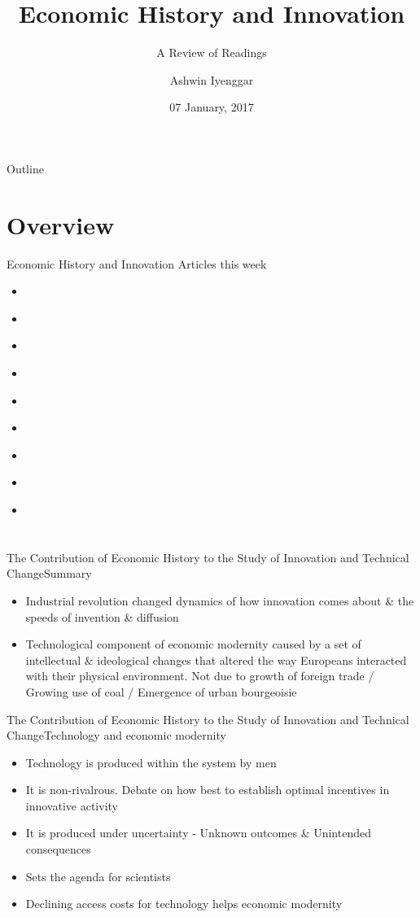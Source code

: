 \documentclass{beamer}
\title{Economic History and Innovation}
\subtitle{A Review of Readings}
\author{Ashwin Iyenggar}
\institute[Indian Institute of Management Bangalore] 
{
  Corporate Strategy and Policy\\
  Indian Institute of Management Bangalore
}
\date{07 January, 2017}
\begin{document}
\begin{frame}
  \titlepage
\end{frame}

\begin{frame}{Outline}
  \tableofcontents
\end{frame}

\section{Overview}
\begin{frame}{Economic History and Innovation}{}
Articles this week
\begin{itemize}
\item{\cite{Temin1997}}
\item{\cite{Epstein1998}}
\item{\cite{Gray2013}}
\item{\cite{Khan2001}}
\item{\cite{Khan1993}}
\item{\citet{Khan2004}}
\item{\cite{Mokyr2010}}
\item{\cite{Schumpeter1947}}
\item{\cite{Moser2013}}
\end{itemize}
\end{frame}

\section{\cite{Mokyr2010}}
\begin{frame}{The Contribution of Economic History to the Study of Innovation and Technical Change}{Summary}
\begin{itemize}
\item{Industrial revolution changed dynamics of how innovation comes about \& the speeds of invention \& diffusion}
\item{Technological component of economic modernity caused by a set of intellectual \& ideological changes that altered the way Europeans interacted with their physical environment. Not due to growth of foreign trade / Growing use of coal / Emergence of urban bourgeoisie}
\end{itemize}
\end{frame}

\begin{frame}{The Contribution of Economic History to the Study of Innovation and Technical Change}{Technology and economic modernity}
\begin{itemize}
\item{Technology is produced within the system by men}
\item{It is non-rivalrous. Debate on how best to establish optimal incentives in innovative activity}
\item{It is produced under uncertainty - Unknown outcomes \& Unintended consequences}
\item{Sets the agenda for scientists}
\item{Declining access costs for technology helps economic modernity}
\end{itemize}
\end{frame}
\end{document}
